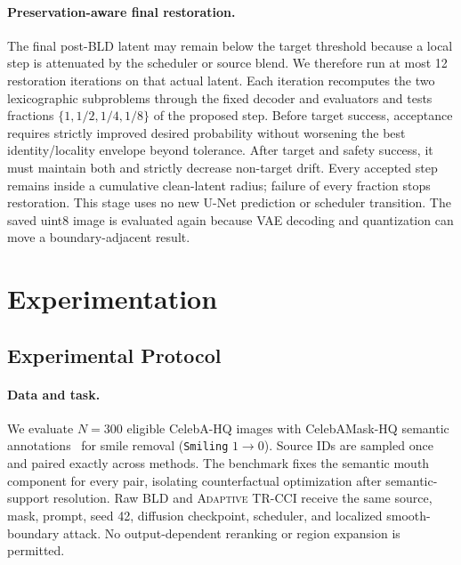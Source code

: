 \documentclass[10pt,twocolumn]{article}
\newcommand{\method}{\textsc{Adaptive TR-CCI}}
\newcommand{\bld}{\textsc{BLD}}
\begin{document}
\paragraph{Preservation-aware final restoration.}
The final post-\bld{} latent may remain below the target threshold because a
local step is attenuated by the scheduler or source blend. We therefore run at
most 12 restoration iterations on that actual latent. Each iteration
recomputes the two lexicographic subproblems through the fixed decoder and
evaluators and tests fractions $\{1,1/2,1/4,1/8\}$ of the proposed step. Before
target success, acceptance requires strictly improved desired probability
without worsening the best identity/locality envelope beyond tolerance. After
target and safety success, it must maintain both and strictly decrease
non-target drift. Every accepted step remains inside a cumulative clean-latent
radius; failure of every fraction stops restoration. This stage uses no new
U-Net prediction or scheduler transition. The saved uint8 image is evaluated
again because VAE decoding and quantization can move a boundary-adjacent result.

\section{Experimentation}

\subsection{Experimental Protocol}
\label{sec:protocol}

\paragraph{Data and task.}
We evaluate $N=300$ eligible CelebA-HQ images with CelebAMask-HQ semantic
annotations~\cite{liu2015celeba,lee2020maskgan} for smile removal
(\texttt{Smiling} $1\!\rightarrow\!0$). Source IDs are sampled once and paired
exactly across methods. The benchmark fixes the semantic mouth component for
every pair, isolating counterfactual optimization after semantic-support
resolution. Raw \bld{} and \method{} receive the same source, mask, prompt,
seed 42, diffusion checkpoint, scheduler, and localized smooth-boundary attack.
No output-dependent reranking or region expansion is permitted.
\end{document}

